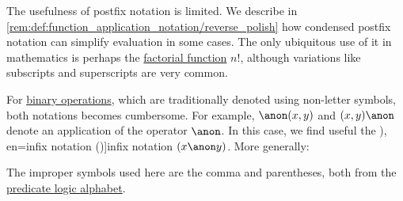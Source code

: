 \begin{definition}
\begin{thmenum}
    The usefulness of postfix notation is limited. We describe in \cref{rem:def:function_application_notation/reverse_polish} how condensed postfix notation can simplify evaluation in some cases. The only ubiquitous use of it in mathematics is perhaps the \hyperref[def:factorial]{factorial function} \( n! \), although variations like subscripts and superscripts are very common.

     For \hyperref[def:operation_on_set]{binary operations}, which are traditionally denoted using non-letter symbols, both notations becomes cumbersome. For example, \( \anon(x, y) \) and \( (x, y)\anon \) denote an application of the operator \( \anon \). In this case, we find useful the \term[ru=инфиксная форма (\cite[example 6.6]{БелоусовТкачёв2004ДискретнаяМатематика}), en=infix notation (\cite[833]{HighamEtAl2015PrincetonCompanion})]{infix notation} \( (x \anon y) \). More generally:
    \begin{bnf*}
       {\bnftsq{(} \bnfsp {} \bnfsp \bnfts{\( \anon \)} \bnfsp {} \bnfsp \bnftsq{)}}
    \end{bnf*}
  \end{thmenum}
\end{definition}
\begin{comments}
  \item The improper symbols used here are the comma and parentheses, both from the \hyperref[def:predicate_logic_alphabet]{predicate logic alphabet}.
\end{comments}

